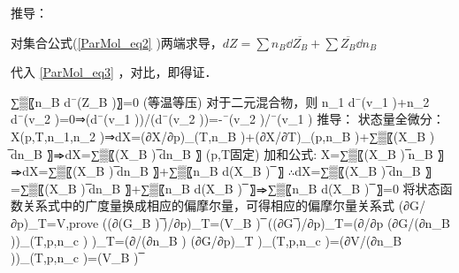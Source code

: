 推导：

对集合公式(\autoref{ParMol_eq2} )两端求导，$dZ=\sum n_B \dd {\overline {Z_B}} + \sum \overline {Z_B}  \dd n_B$

代入 \autoref{ParMol_eq3} ，对比，即得证．


	∑▒〖n_B d¯(Z_B )〗=0 (等温等压)
	对于二元混合物，则 n_1 d¯(v_1 )+n_2 d¯(v_2 )=0⇒(d¯(v_1 ))/(d¯(v_2 ))=-¯(v_2 )/¯(v_1 )
	推导：
	状态量全微分：X(p,T,n_1,n_2 )⇒dX=(∂X/∂p)_(T,n_B )+(∂X/∂T)_(p,n_B )+∑▒〖(X_B ) ̅dn_B 〗⇒dX=∑▒〖(X_B ) ̅dn_B 〗  (p,T固定)
	加和公式: X=∑▒〖(X_B ) ̅n_B 〗⇒dX=∑▒〖(X_B ) ̅dn_B 〗+∑▒〖n_B d(X_B ) ̅ 〗
	∴dX=∑▒〖(X_B ) ̅dn_B 〗=∑▒〖(X_B ) ̅dn_B 〗+∑▒〖n_B d(X_B ) ̅ 〗⇒∑▒〖n_B d(X_B ) ̅ 〗=0
	将状态函数关系式中的广度量换成相应的偏摩尔量，可得相应的偏摩尔量关系式
	(∂G/∂p)_T=V,prove ((∂(G_B ) ̅)/∂p)_T=(V_B ) ̅
	((∂G ̅)/∂p)_T=(∂/∂p (∂G/(∂n_B ))_(T,p,n_c ) )_T=(∂/(∂n_B ) (∂G/∂p)_T )_(T,p,n_c )=(∂V/(∂n_B ))_(T,p,n_c )=(V_B ) ̅

